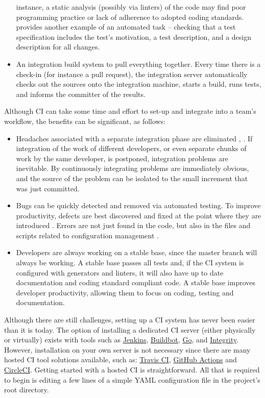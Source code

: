 \documentclass[final, 3p, times, authoryear]{elsarticle}
\begin{document}
\begin{itemize}
	instance, a static analysis (possibly via linters) of the code may find poor
	programming practice or lack of adherence to adopted coding standards.
	\citet{SlaughterEtAl2021} provides another example of an automated task --
	checking that a test specification includes the test's motivation, a test
	description, and a design description for all changes. 
	\item An integration build system to pull everything together.  Every time
	there is a check-in (for instance a pull request), the integration server
	automatically checks out the sources onto the integration machine, starts a
	build, runs tests, and informs the committer of the results. 
\end{itemize}

Although CI can take some time and effort to set-up and integrate into a team's
workflow, the benefits can be significant, as follows:

\begin{itemize}
	\item Headaches associated with a separate integration phase are eliminated
	\citep{Fowler2006}, \citep[p.\ 20]{HumbleAndFarley2010}. If integration of
	the work of different developers, or even separate chunks of work by the
	same developer, is postponed, integration problems are inevitable.  By
	continuously integrating problems are immediately obvious, and the source of
	the problem can be isolated to the small increment that was just committed.
	\item Bugs can be quickly detected and removed \citep{Fowler2006} via
	automated testing.  To improve productivity, defects are best discovered and
	fixed at the point where they are introduced \citep[p.\
	23]{HumbleAndFarley2010}.  Errors are not just found in the code, but also
	in the files and scripts related to configuration management \citep[p.\
	18]{HumbleAndFarley2010}.
	\item Developers are always working on a stable base, since the master
	branch will always be working.  A stable base passes all tests and, if the
	CI system is configured with generators and linters, it will also have up to
	date documentation and coding standard compliant code.  A stable base
	improves developer productivity, allowing them to focus on coding, testing
	and documentation.
\end{itemize}

Although there are still challenges, setting up a CI system has never been
easier than it is today.  The option of installing a dedicated CI server (either
physically or virtually) exists with tools such as
\href{https://www.jenkins.io/} {Jenkins}, \href{http://buildbot.net/}
{Buildbot}, \href{https://www.gocd.org/} {Go}, and
\href{http://integrity.github.io/} {Integrity}. However, installation on your
own server is not necessary since there are many hosted CI tool solutions
available, such as: \href{https://travis-ci.org/} {Travis CI},
\href{https://github.com/features/actions} {GitHub Actions} and
\href{https://circleci.com/} {CircleCI}.  Getting started with a hosted CI is
straightforward.  All that is required to begin is editing a few lines of a
simple YAML configuration file in the project's root directory.
\end{document}
